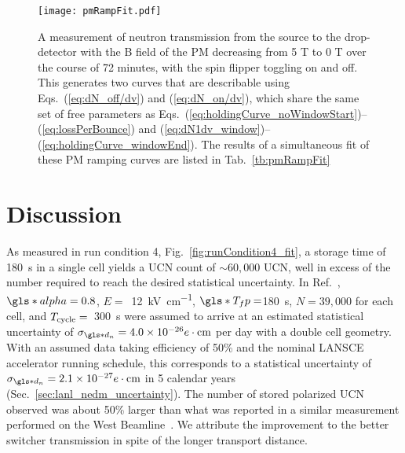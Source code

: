 \begin{figure}[htp]
    \centering
    \texttt{[image: pmRampFit.pdf]}
    \caption[A measurement of neutron transmission from the source to the drop-detector with the B field of the PM decreasing from 5 T to 0 T over the course of 72 minutes, with the spin flipper toggling on and off.]{A measurement of neutron transmission from the source to the drop-detector with the B field of the PM decreasing from 5 T to 0 T over the course of 72 minutes, with the spin flipper toggling on and off. This generates two curves that are describable using Eqs.~(\ref{eq:dN_off/dv}) and (\ref{eq:dN_on/dv}), which share the same set of free parameters as Eqs.~(\ref{eq:holdingCurve_noWindowStart})--(\ref{eq:lossPerBounce}) and  (\ref{eq:dN1dv_window})--(\ref{eq:holdingCurve_windowEnd}). The results of a simultaneous fit of these PM ramping curves are listed in Tab.~\ref{tb:pmRampFit}}
    \label{fig:pmRampFit}
\end{figure}


\section{\label{sec:north_beamline_discussion}Discussion}


As measured in run condition 4, Fig.~\ref{fig:runCondition4_fit}, a storage time of \qty{180}{\s} in a single cell yields a UCN count of $\sim60,000$ UCN, well in excess of the number required to reach the desired statistical uncertainty. In Ref.~\cite{ito_performance_2018}, $\gls*{alpha}=0.8$, $E=$~\qty{12}{\kilo\volt\per\cm}, $\gls*{T_fp}=$\qty{180}{\s}, $N=39,000$ for each cell, and $T_{\rm cycle} =$~\qty{300}{\s} were assumed to arrive at an estimated statistical uncertainty of $\sigma_{\gls*{d_n}}=4.0\times 10^{-26}e\cdot\text{cm}$ per day with a double cell geometry. With an assumed data taking efficiency of 50\% and the nominal LANSCE accelerator running schedule, this corresponds to a statistical uncertainty of $\sigma_{\gls*{d_n}}=2.1\times 10^{-27}e\cdot\text{cm}$ in 5 calendar years (Sec.~\ref{sec:lanl_nedm_uncertainty}). The number of stored polarized UCN observed was about 50\% larger than what was reported in a similar measurement performed on the West Beamline~\cite{ito_performance_2018}. We attribute the improvement to the better switcher transmission in spite of the longer transport distance. 

